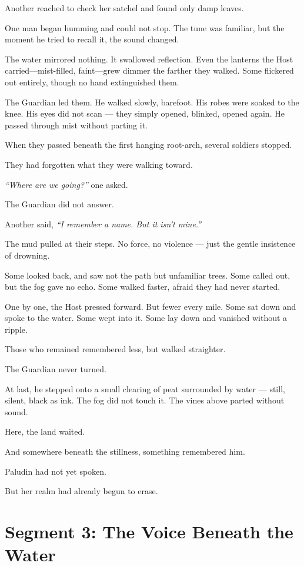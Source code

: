 \documentclass[9pt]{article}
\begin{document}
Another reached to check her satchel and found only damp leaves.

One man began humming and could not stop. The tune was familiar, but the moment he tried to recall it, the sound changed.

The water mirrored nothing. It swallowed reflection. Even the lanterns the Host carried—mist-filled, faint—grew dimmer the farther they walked. Some flickered out entirely, though no hand extinguished them.

The Guardian led them. He walked slowly, barefoot. His robes were soaked to the knee. His eyes did not scan — they simply opened, blinked, opened again. He passed through mist without parting it.

When they passed beneath the first hanging root-arch, several soldiers stopped.

They had forgotten what they were walking toward.

\textit{``Where are we going?''} one asked.

The Guardian did not answer.

Another said, \textit{``I remember a name. But it isn't mine.''}

The mud pulled at their steps. No force, no violence — just the gentle insistence of drowning.

Some looked back, and saw not the path but unfamiliar trees. Some called out, but the fog gave no echo. Some walked faster, afraid they had never started.

One by one, the Host pressed forward. But fewer every mile. Some sat down and spoke to the water. Some wept into it. Some lay down and vanished without a ripple.

Those who remained remembered less, but walked straighter.

The Guardian never turned.

At last, he stepped onto a small clearing of peat surrounded by water — still, silent, black as ink. The fog did not touch it. The vines above parted without sound.

Here, the land waited.

And somewhere beneath the stillness, something remembered him.

Paludin had not yet spoken.

But her realm had already begun to erase.

\newpage

\section*{Segment 3: The Voice Beneath the Water}
\end{document}
